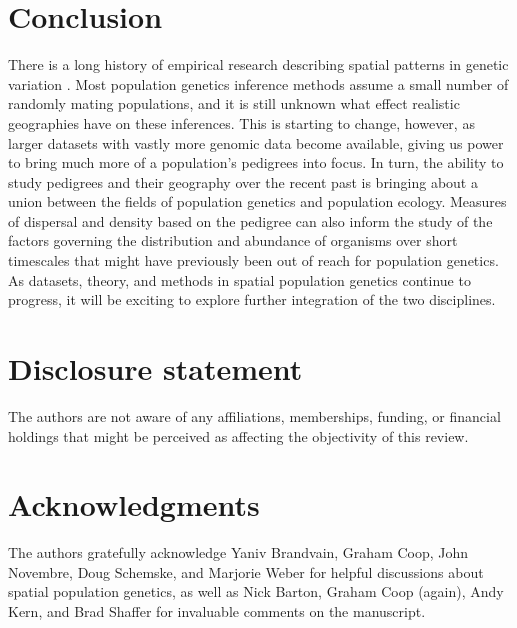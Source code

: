\documentclass{ar-1col}
\begin{document}
\section*{Conclusion}

There is a long history of empirical research describing spatial patterns
in genetic variation \citep{dobzhansky1947,human_blood_types,landscape_genomics_review}.
Most population genetics inference methods assume a small number of randomly mating populations,
and it is still unknown what effect realistic geographies have on these inferences.
This is starting to change, however,
as larger datasets with vastly more genomic data become available,
giving us power to bring much more of a population's pedigrees into focus.
In turn, the ability to study pedigrees and their geography 
over the recent past is bringing about a union 
between the fields of population genetics and population ecology.
Measures of dispersal and density based on the pedigree 
can also inform the study of the factors governing the 
distribution and abundance of organisms 
over short timescales that might have previously been out of reach for population genetics.
As datasets, theory, and methods in spatial population genetics continue to progress, 
it will be exciting to explore further integration of the two disciplines.

\section*{Disclosure statement}
The authors are not aware of any affiliations, memberships, funding, or financial holdings 
that might be perceived as affecting the objectivity of this review.

\section*{Acknowledgments}
The authors gratefully acknowledge 
Yaniv Brandvain, Graham Coop, 
John Novembre, Doug Schemske, 
and Marjorie Weber for helpful discussions about spatial population genetics,
as well as Nick Barton, Graham Coop (again), Andy Kern, and Brad Shaffer 
for invaluable comments on the manuscript.



\end{document}
